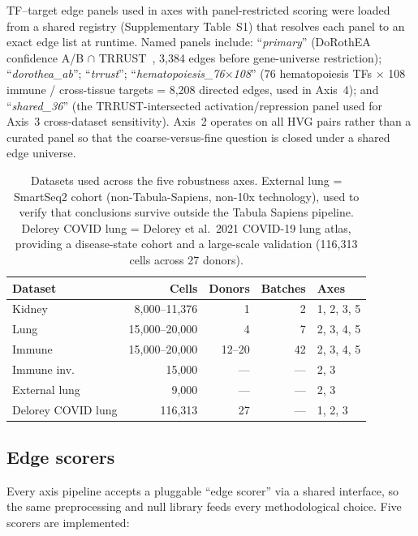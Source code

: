 \documentclass[12pt]{article}
\begin{document}
TF--target edge panels used in axes with panel-restricted scoring were
loaded from a shared registry (Supplementary Table~S1) that resolves each
panel to an exact edge list at runtime. Named panels include:
``\emph{primary}'' (DoRothEA~\citep{GarciaAlonso2019} confidence A/B
$\cap$ TRRUST~\citep{Han2018}, 3{,}384 edges before gene-universe
restriction); ``\emph{dorothea\_ab}''; ``\emph{trrust}'';
``\emph{hematopoiesis\_76$\times$108}'' (76 hematopoiesis TFs $\times$ 108
immune / cross-tissue targets = 8{,}208 directed edges, used in
Axis~4); and ``\emph{shared\_36}'' (the TRRUST-intersected
activation/repression panel used for Axis~3 cross-dataset sensitivity).
Axis~2 operates on all HVG pairs rather than a curated panel so that the
coarse-versus-fine question is closed under a shared edge universe.

\begin{table}[ht]
\centering
\caption{Datasets used across the five robustness axes. External lung =
\citet{Travaglini2020} SmartSeq2 cohort (non-Tabula-Sapiens, non-10x
technology), used to verify that conclusions survive outside the
Tabula Sapiens pipeline. Delorey COVID lung = Delorey et al.\ 2021
COVID-19 lung atlas, providing a disease-state cohort and a
large-scale validation (116{,}313 cells across 27 donors).}
\label{tab:datasets}
\small
\begin{tabular}{lrrrl}
\toprule
\textbf{Dataset} & \textbf{Cells} & \textbf{Donors} & \textbf{Batches} & \textbf{Axes} \\
\midrule
Kidney              & 8{,}000--11{,}376  & 1    & 2  & 1, 2, 3, 5 \\
Lung                & 15{,}000--20{,}000 & 4    & 7  & 2, 3, 4, 5 \\
Immune              & 15{,}000--20{,}000 & 12--20 & 42 & 2, 3, 4, 5 \\
Immune inv.         & 15{,}000           & ---  & --- & 2, 3 \\
External lung       & 9{,}000            & ---  & --- & 2, 3 \\
Delorey COVID lung  & 116{,}313          & 27   & --- & 1, 2, 3 \\
\bottomrule
\end{tabular}
\end{table}

\subsection{Edge scorers}

Every axis pipeline accepts a pluggable ``edge scorer'' via a shared
interface, so the same preprocessing and null library feeds every
methodological choice. Five scorers are implemented:
\end{document}
